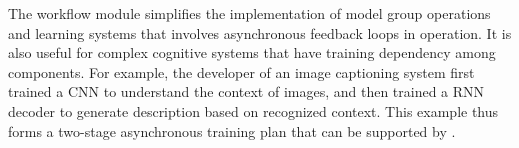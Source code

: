 The workflow module simplifies the implementation of model group operations and learning systems that involves asynchronous feedback loops in operation. It is also 
useful for complex cognitive systems
that have training dependency among components. 
For example, the developer of an image captioning system \cite{showandtell2015} first trained
a CNN to understand the context of images, and then trained a
RNN decoder to generate description based on recognized context. This example
thus forms a two-stage asynchronous training plan that can be supported by \tl.



















